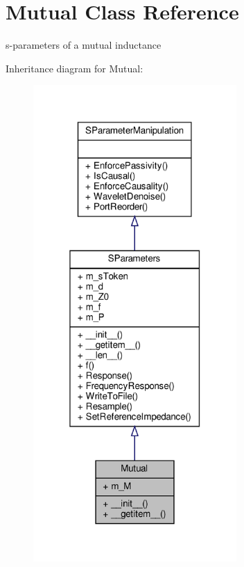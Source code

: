\hypertarget{classSignalIntegrity_1_1SParameters_1_1Devices_1_1Mutual_1_1Mutual}{}\section{Mutual Class Reference}
\label{classSignalIntegrity_1_1SParameters_1_1Devices_1_1Mutual_1_1Mutual}


s-\/parameters of a mutual inductance  




Inheritance diagram for Mutual\+:
\nopagebreak
\begin{figure}[H]
\begin{center}
\leavevmode
\includegraphics[width=220pt]{classSignalIntegrity_1_1SParameters_1_1Devices_1_1Mutual_1_1Mutual__inherit__graph}
\end{center}
\end{figure}


